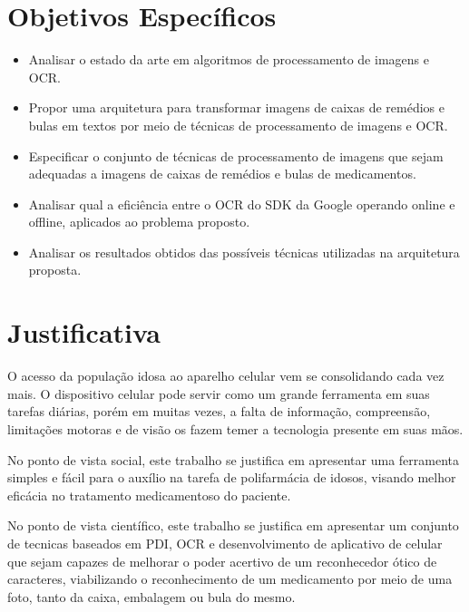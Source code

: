 \section{Objetivos Específicos}

\begin{itemize}
	\item Analisar o estado da arte em algoritmos de processamento de imagens e OCR.
	\item Propor uma arquitetura para transformar imagens de caixas de remédios e bulas em textos por meio de técnicas de processamento de imagens e OCR.
	\item Especificar o conjunto de técnicas de processamento de imagens que sejam adequadas a imagens de caixas de remédios e bulas de medicamentos.
	\item Analisar qual a eficiência entre o OCR do SDK da Google operando online e offline, aplicados ao problema proposto.
	\item Analisar os resultados obtidos das possíveis técnicas utilizadas na arquitetura proposta.

\end{itemize}


\section{Justificativa}


O acesso da população idosa ao aparelho celular vem se consolidando cada vez mais. O dispositivo celular pode servir como um grande ferramenta em suas tarefas diárias, porém em muitas vezes, a falta de informação, compreensão, limitações motoras e de visão os fazem temer a tecnologia presente em suas mãos. 

No ponto de vista social, este trabalho se justifica em apresentar uma ferramenta simples e fácil para o auxílio na tarefa de polifarmácia de idosos, visando melhor eficácia no tratamento medicamentoso do paciente.

No ponto de vista científico, este trabalho se justifica em apresentar um conjunto de tecnicas baseados em PDI, OCR e desenvolvimento de aplicativo de celular que sejam capazes de melhorar o poder acertivo de um reconhecedor ótico de caracteres, viabilizando o reconhecimento de um medicamento por meio de uma foto, tanto da caixa, embalagem ou bula do mesmo.







